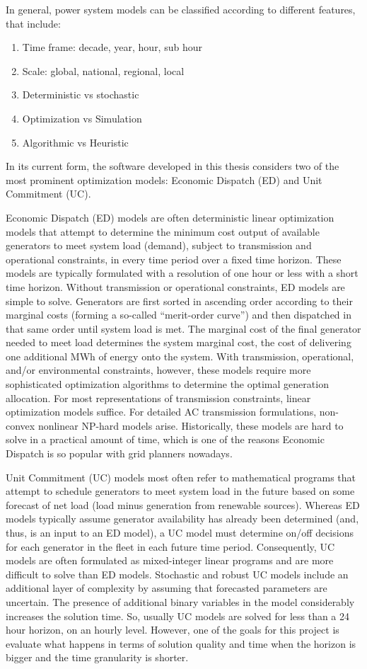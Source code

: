 \documentclass[12pt,LUDisStyle,twosided]{book}
\begin{document}
In general, power system models can be classified according to different features, that include:

\begin{enumerate}
\item Time frame: decade, year, hour, sub hour 
\item Scale: global, national, regional, local
\item Deterministic vs stochastic
\item Optimization vs Simulation
\item Algorithmic vs Heuristic
\end{enumerate}

In its current form, the software developed in this thesis considers two of the most prominent optimization models: Economic Dispatch (ED) and Unit Commitment (UC). 

Economic Dispatch (ED) models are often deterministic linear optimization models that attempt to determine the minimum cost output of available generators to meet system load (demand), subject to transmission and operational constraints, in every time period over a fixed time horizon.  These models are typically formulated with a resolution of one hour or less with a short time horizon. Without transmission or operational constraints, ED models are simple to solve. Generators are first sorted in ascending order according to their marginal costs (forming a so-called ``merit-order curve'') and then dispatched in that same order until system load is met. The marginal cost of the final generator needed to meet load determines the system marginal cost, the cost of delivering one additional MWh of energy onto the system.  With transmission, operational, and/or environmental constraints, however, these models require more sophisticated optimization algorithms to determine the optimal generation allocation.  For most representations of transmission constraints, linear optimization models suffice.  For detailed AC transmission formulations, non-convex nonlinear NP-hard models arise. Historically, these models are hard to solve in a practical amount of time, which is one of the reasons Economic Dispatch is so popular with grid planners nowadays.

Unit Commitment (UC) models most often refer to mathematical programs that attempt to schedule generators to meet system load in the future based on some forecast of net load (load minus generation from renewable sources).  Whereas ED models typically assume generator availability has already been determined (and, thus, is an input to an ED model), a UC model must determine on/off decisions for each generator in the fleet in each future time period.  Consequently, UC models are often formulated as mixed-integer linear programs and are more difficult to solve than ED models. Stochastic and robust UC models include an additional layer of complexity by assuming that forecasted parameters are uncertain. The presence of additional binary variables in the model considerably increases the solution time. So, usually UC models are solved for less than a 24 hour horizon, on an hourly level. However, one of the goals for this project is evaluate what happens in terms of solution quality and time when the horizon is bigger and the time granularity is shorter.
\end{document}
